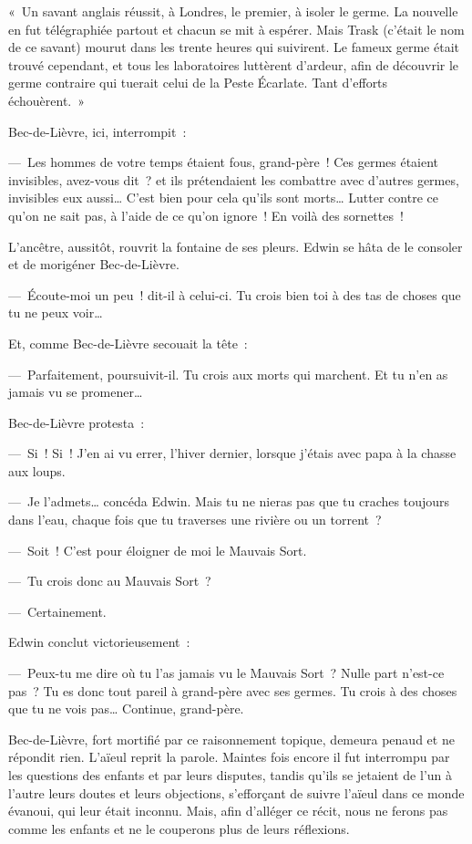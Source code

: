 \documentclass[french,twoside]{book} %
\begin{document}
« Un savant anglais réussit, à Londres, le premier, à isoler le germe. La nouvelle en fut télégraphiée partout et chacun se mit à espérer. Mais Trask (c’était le nom de ce savant) mourut dans les trente heures qui suivirent. Le fameux germe était trouvé cependant, et tous les laboratoires luttèrent d’ardeur, afin de découvrir le germe contraire qui tuerait celui de la Peste Écarlate. Tant d’efforts échouèrent. »\par
Bec-de-Lièvre, ici, interrompit :\par
— Les hommes de votre temps étaient fous, grand-père ! Ces germes étaient invisibles, avez-vous dit ? et ils prétendaient les combattre avec d’autres germes, invisibles eux aussi… C’est bien pour cela qu’ils sont morts… Lutter contre ce qu’on ne sait pas, à l’aide de ce qu’on ignore ! En voilà des sornettes !\par
L’ancêtre, aussitôt, rouvrit la fontaine de ses pleurs. Edwin se hâta de le consoler et de morigéner Bec-de-Lièvre.\par
— Écoute-moi un peu ! dit-il à celui-ci. Tu crois bien toi à des tas de choses que tu ne peux voir…\par
Et, comme Bec-de-Lièvre secouait la tête :\par
— Parfaitement, poursuivit-il. Tu crois aux morts qui marchent. Et tu n’en as jamais vu se promener…\par
Bec-de-Lièvre protesta :\par
— Si ! Si ! J’en ai vu errer, l’hiver dernier, lorsque j’étais avec papa à la chasse aux loups.\par
— Je l’admets… concéda Edwin. Mais tu ne nieras pas que tu craches toujours dans l’eau, chaque fois que tu traverses une rivière ou un torrent ?\par
— Soit ! C’est pour éloigner de moi le Mauvais Sort.\par
— Tu crois donc au Mauvais Sort ?\par
— Certainement.\par
Edwin conclut victorieusement :\par
— Peux-tu me dire où tu l’as jamais vu le Mauvais Sort ? Nulle part n’est-ce pas ? Tu es donc tout pareil à grand-père avec ses germes. Tu crois à des choses que tu ne vois pas… Continue, grand-père.\par
Bec-de-Lièvre, fort mortifié par ce raisonnement topique, demeura penaud et ne répondit rien. L’aïeul reprit la parole. Maintes fois encore il fut interrompu par les questions des enfants et par leurs disputes, tandis qu’ils se jetaient de l’un à l’autre leurs doutes et leurs objections, s’efforçant de suivre l’aïeul dans ce monde évanoui, qui leur était inconnu. Mais, afin d’alléger ce récit, nous ne ferons pas comme les enfants et ne le couperons plus de leurs réflexions.\par
\end{document}
